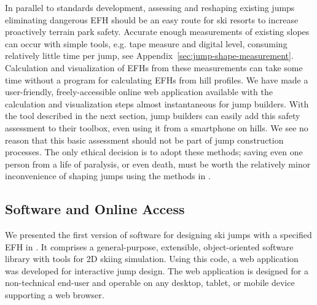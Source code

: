 \documentclass[smallextended]{svjour3}       %
\begin{document}
In parallel to standards development, assessing and reshaping existing jumps
eliminating dangerous EFH should be an easy route for ski resorts to increase proactively
terrain park safety. Accurate enough measurements of
existing slopes can occur with simple tools, e.g. tape measure and digital
level, consuming relatively little time per jump, see
Appendix~\ref{sec:jump-shape-measurement}. Calculation and visualization of
EFHs from these measurements can take some time without a program for
calculating EFHs from hill profiles. We have made a user-friendly, freely-accessible 
online web application available with the
calculation and visualization steps almost instantaneous for jump builders. With
the tool described in the next section, jump builders can easily add this
safety assessment to their toolbox, even using it from a smartphone on hills.
We see no reason that this basic assessment should not be part of jump
construction processes. The only ethical decision is to adopt these methods;
saving even one person from a life of paralysis, or even death, must be worth
the relatively minor inconvenience of shaping jumps using the methods in
\cite{Levy2015}.


\subsection{Software and Online Access}
\label{sec:software}
%
We presented the first version of software for designing ski jumps with a
specified EFH in \cite{Moore2018}. It comprises
a general-purpose, extensible, object-oriented software library with tools for
2D skiing simulation. Using this code, a web application was developed
for interactive jump design. The web application is designed for a
non-technical end-user and operable on any desktop, tablet, or mobile device
supporting a web browser.
\end{document}

